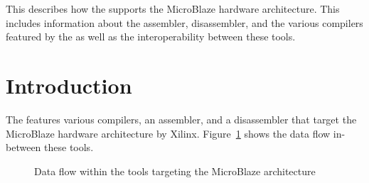 




\renewcommand{\seemibl}{}

{This \documentation{} describes how the \ecs{} supports the MicroBlaze hardware architecture.
This includes information about the assembler, disassembler, and the various compilers featured by the \ecs{} as well as the interoperability between these tools.}

\section{Introduction}

The \ecs{} features various compilers, an assembler, and a disassembler that target the MicroBlaze hardware architecture by Xilinx.
Figure~\ref{fig:mibldataflow} shows the data flow in-between these tools.

\begin{figure}
\caption{Data flow within the tools targeting the MicroBlaze architecture}
\label{fig:mibldataflow}
\end{figure}

